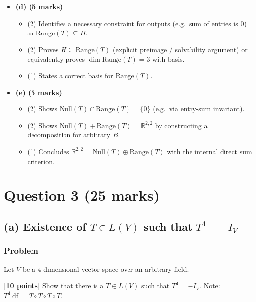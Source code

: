\documentclass[12pt]{article}
\newcommand{\R}{\mathbb{R}}
\begin{document}
\begin{itemize}[leftmargin=1.6em]
  \item \textbf{(d) (5 marks)}
  \begin{itemize}[leftmargin=1.6em]
    \item (2) Identifies a necessary constraint for outputs (e.g.\ sum of entries is $0$) so $\mathrm{Range}(T)\subseteq H$.
    \item (2) Proves $H\subseteq \mathrm{Range}(T)$ (explicit preimage / solvability argument) or equivalently proves $\dim\mathrm{Range}(T)=3$ with basis.
    \item (1) States a correct basis for $\mathrm{Range}(T)$.
  \end{itemize}

  \item \textbf{(e) (5 marks)}
  \begin{itemize}[leftmargin=1.6em]
    \item (2) Shows $\mathrm{Null}(T)\cap \mathrm{Range}(T)=\{0\}$ (e.g.\ via entry-sum invariant).
    \item (2) Shows $\mathrm{Null}(T)+\mathrm{Range}(T)=\R^{2,2}$ by constructing a decomposition for arbitrary $B$.
    \item (1) Concludes $\R^{2,2}=\mathrm{Null}(T)\oplus \mathrm{Range}(T)$ with the internal direct sum criterion.
  \end{itemize}
\end{itemize}

\newpage

\section{Question 3 \hfill (25 marks)}

\subsection{(a) Existence of \(T\in L(V)\) such that \(T^4=-I_V\)}
\subsubsection{Problem}
Let \(V\) be a \(4\)-dimensional vector space over an arbitrary field.

\noindent \textbf{[10 points]} Show that there is a \(T\in L(V)\) such that \(T^4=-I_V\).
\newline Note: \(T^4\ \mathrm{df}=\ T\circ T\circ T\circ T\).
\end{document}
